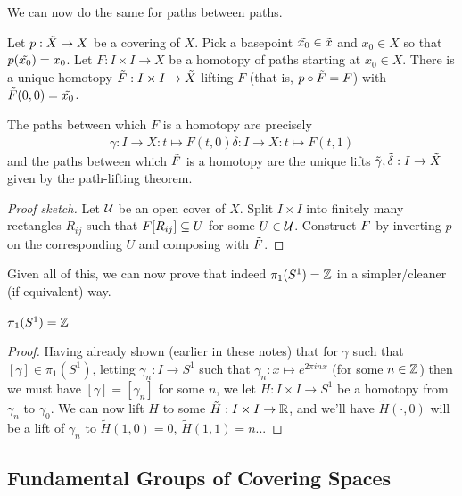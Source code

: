 We can now do the same for paths between paths.

\begin{boxtheorem}
    Let $p : \Tilde{X} \to X$ be a covering of $X$. Pick a basepoint $\Tilde{x_0} \in \Tilde{x}$ and $x_0 \in X$ so that $p\!\left( \Tilde{x_0} \right) = x_0$. Let $F : I \times I \to X$ be a homotopy of paths starting at $x_0 \in X$. There is a unique homotopy $\Tilde{F} : I \times I \to \Tilde{X}$ lifting $F$ (that is, $p \circ \Tilde{F} = F$) with $\Tilde{F}\!\left( 0, 0 \right) = \Tilde{x_0}$.
\end{boxtheorem}
The paths between which $F$ is a homotopy are precisely
\begin{align*}
    \gamma : I \to X : t \mapsto F(t, 0)
    \delta : I \to X : t \mapsto F(t, 1)
\end{align*}
and the paths between which $\Tilde{F}$ is a homotopy are the unique lifts $\Tilde{\gamma}, \Tilde{\delta} : I \to \Tilde{X}$ given by the path-lifting theorem.
\begin{proof}[Proof sketch]
    Let $\mathcal{U}$ be an open cover of $X$. Split $I \times I$ into finitely many rectangles $R_{ij}$ such that $F\!\left[ R_{ij} \right] \subseteq U$ for some $U \in \mathcal{U}$. Construct $\Tilde{F}$ by inverting $p$ on the corresponding $U$ and composing with $\Tilde{F}$.
\end{proof}

Given all of this, we can now prove that indeed $\pi_1(S^1)=\mathbb{Z}$ in a simpler/cleaner (if equivalent) way.

\begin{boxtheorem}
    $\pi_1(S^1)=\mathbb{Z}$
\end{boxtheorem}
\begin{proof}
    Having already shown (earlier in these notes) that for $\gamma$ such that $[\gamma]\in \pi_1(S^1)$, letting $\gamma_n:I\rightarrow S^1$ such that $\gamma_n:x\mapsto e^{2\pi i nx}$ (for some $n\in \mathbb{Z}$) then we must have $[\gamma]=[\gamma_n]$ for some $n$, we let $H:I\times I \rightarrow S^1$ be a homotopy from $\gamma_n$ to $\gamma_0$. We can now lift $H$ to some $\tilde{H}:I\times I \rightarrow \mathbb{R}$, and we'll have $\tilde{H}(\cdot, 0)$ will be a lift of $\gamma_n$ to $\tilde{H}(1,0)=0$, $\tilde{H}(1,1)=n$...\sorry
\end{proof}

\subsection{Fundamental Groups of Covering Spaces}

